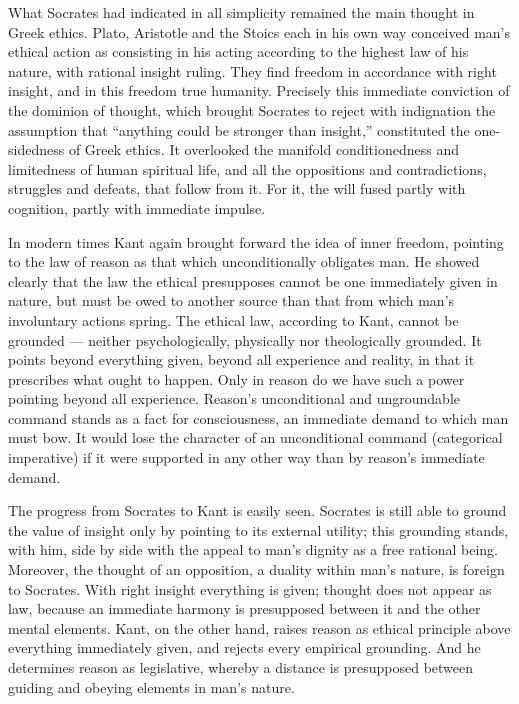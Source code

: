 \documentclass[12pt,a4paper,openany]{book}
\newcommand{\opage}[1]{\marginnote{\footnotesize\textit{[#1]}}}
\begin{document}
What Socrates had indicated in all simplicity remained the main thought in
Greek ethics. Plato, Aristotle and the Stoics each in his own way conceived
man's ethical action as consisting in his acting according to the highest law
of his nature, with rational insight ruling. They find freedom in accordance
with right insight, and in this freedom true humanity. Precisely this
immediate conviction of the dominion of thought, which brought Socrates to
reject with indignation the assumption that ``anything could be stronger than
insight,'' constituted the one-sidedness of Greek ethics. It overlooked the
manifold conditionedness and limitedness of human spiritual life, and all the
oppositions and contradictions, struggles and defeats, that follow from it.
For it, the will fused partly \opage{48}with cognition, partly with immediate
impulse.

In modern times Kant again brought forward the idea of inner freedom, pointing
to the law of reason as that which unconditionally obligates man. He showed
clearly that the law the ethical presupposes cannot be one immediately given
in nature, but must be owed to another source than that from which man's
involuntary actions spring. The ethical law, according to Kant, cannot be
grounded --- neither psychologically, physically nor theologically grounded.
It points beyond everything given, beyond all experience and reality, in that
it prescribes what ought to happen. Only in reason do we have such a power
pointing beyond all experience. Reason's unconditional and ungroundable
command stands as a fact for consciousness, an immediate demand to which man
must bow. It would lose the character of an unconditional command (categorical
imperative) if it were supported in any other way than by reason's immediate
demand.

The progress from Socrates to Kant is easily seen. Socrates is still able to
ground the value of insight only by pointing to its external utility; this
grounding stands, with him, side by side with the appeal to man's dignity as a
free rational being. Moreover, the thought of an opposition, a duality within
man's nature, is foreign to Socrates. With right insight everything is given;
thought does not appear as law, because an immediate harmony is presupposed
between it and the other \opage{49}mental elements. Kant, on the other hand,
raises reason as ethical principle above everything immediately given, and %
rejects every empirical grounding. And he determines reason as legislative,
whereby a distance is presupposed between guiding and obeying elements in
man's nature.
\end{document}
